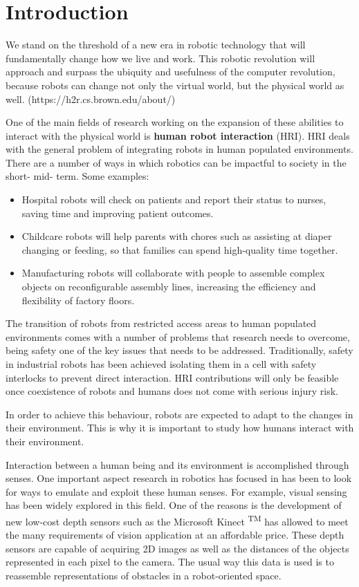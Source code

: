 \chapter{Introduction}
\label{introchap}

We stand on the threshold of a new era in robotic technology that will fundamentally change how we live and work. This robotic revolution will approach and surpass the ubiquity and usefulness of the computer revolution, because robots can change not only the virtual world, but the physical world as well. (https://h2r.cs.brown.edu/about/)

One of the main fields of research working on the expansion of these abilities to interact with the physical world is \textbf{human robot interaction} (HRI). HRI deals with the general problem of integrating robots in human populated environments. There are a number of ways in which robotics can be impactful to society in the short- mid- term. Some examples:

\begin{itemize}
    \item Hospital robots will check on patients and report their status to nurses, saving time and improving patient outcomes.
    \item Childcare robots will help parents with chores such as assisting at diaper changing or feeding, so that families can spend high-quality time together.
    \item Manufacturing robots will collaborate with people to assemble complex objects on reconfigurable assembly lines, increasing the efficiency and flexibility of factory floors.
\end{itemize}

The transition of robots from restricted access areas to human populated environments comes with a number of problems that research needs to overcome, being safety one of the key issues that needs to be addressed. Traditionally, safety in industrial robots has been achieved isolating them in a cell with safety interlocks to prevent direct interaction. HRI contributions will only be feasible once coexistence of robots and humans does not come with serious injury risk.

In order to achieve this behaviour, robots are expected to adapt to the changes in their environment. This is why it is important to study how humans interact with their environment.

Interaction between a human being and its environment is accomplished through senses. One important aspect research in robotics has focused in has been to look for ways to emulate and exploit these human senses. For example, visual sensing has been widely explored in this field. One of the reasons is the development of new low-cost depth sensors such as the Microsoft Kinect \textsuperscript{TM} has allowed to meet the many requirements of vision application at an affordable price. These depth sensors are capable of acquiring 2D images as well as the distances of the objects represented in each pixel to the camera. The usual way this data is used is to reassemble representations of obstacles in a robot-oriented space.

